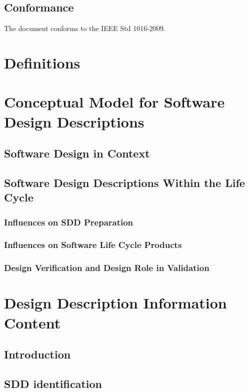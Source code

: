 \documentclass[letterpaper,10pt,titlepage,draftclsnofoot,onecolumn,onesided] {IEEEtran}
\begin{document}
\subsection{Conformance}
The document conforms to the IEEE Std 1016-2009.

\section{Definitions}

\section{Conceptual Model for Software Design Descriptions}
\subsection{Software Design in Context}

\subsection{Software Design Descriptions Within the Life Cycle}
\subsubsection{Influences on SDD Preparation}
\subsubsection{Influences on Software Life Cycle Products}
\subsubsection{Design Verification and Design Role in Validation}

\section{Design Description Information Content}

\subsection{Introduction}

\subsection{SDD identification}
\end{document}
